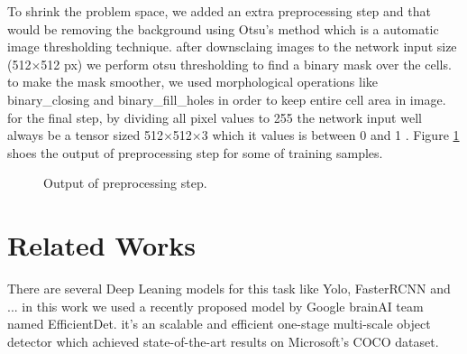 \documentclass[11pt]{article}
\begin{document}
To shrink the problem space, we added an extra preprocessing step and that would be removing the background using Otsu's method which is a automatic image thresholding technique. after downsclaing images to the network input size (512$\times$512 px) we perform otsu thresholding to find a binary mask over the cells. to make the mask smoother, we used morphological operations like binary\_closing and binary\_fill\_holes in order to keep entire cell area in image. for the final step, by dividing all pixel values to 255 the network input well always be a tensor sized 512$\times$512$\times$3 which it values is between 0 and 1 . Figure \ref{fig:pre} shoes the output of preprocessing step for some of training samples.

\begin{figure}[!ht]
	\centering
	\caption{Output of preprocessing step.}
	\qquad
	\qquad
	\label{fig:pre}
\end{figure}

\section{Related Works}

There are several Deep Leaning models for this task like Yolo, FasterRCNN and ... in this work we used a recently proposed model by Google brainAI team named EfficientDet. it's an scalable and efficient one-stage multi-scale object detector which achieved state-of-the-art results on Microsoft's COCO dataset.
\end{document}
